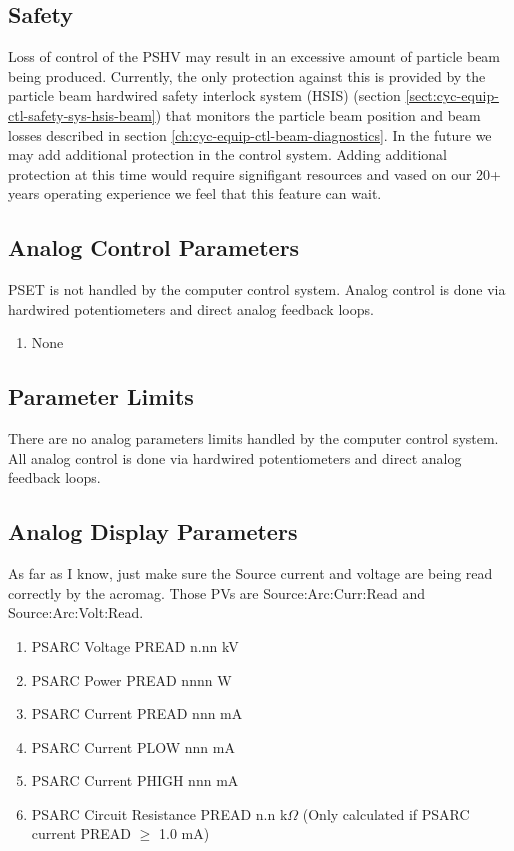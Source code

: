 \documentclass[11pt]{book}		%
\begin{document}
\subsection{Safety}

Loss of control of the PSHV may result in an excessive amount of particle beam being produced.  Currently, the only protection against this is provided by the particle beam hardwired safety interlock system (HSIS) (section \ref{sect:cyc-equip-ctl-safety-sys-hsis-beam}) that monitors the particle beam position and beam losses described in section \ref{ch:cyc-equip-ctl-beam-diagnostics}.  In the future we may add additional protection in the control system.  Adding additional protection at this time would require signifigant resources and vased on our 20+ years operating experience we feel that this feature can wait.

\subsection{Analog Control Parameters}

PSET is not handled by the computer control system.  Analog control is done via hardwired potentiometers and direct analog feedback loops.

\begin{enumerate}
 \item None
\end{enumerate}

\subsection{Parameter Limits}
There are no analog parameters limits handled by the computer control system.  All analog control is done via hardwired potentiometers and direct analog feedback loops.


\subsection{Analog Display Parameters}

\color{red}
As far as I know, just make sure the Source current and voltage are being read correctly by the acromag. Those PVs are Source:Arc:Curr:Read and Source:Arc:Volt:Read.
\color{black}

\begin{enumerate}
 \item PSARC Voltage PREAD n.nn kV
 \item PSARC Power PREAD nnnn W
 \item PSARC Current PREAD nnn mA
 \item PSARC Current PLOW  nnn mA
 \item PSARC Current PHIGH nnn mA
 \item PSARC Circuit Resistance PREAD  n.n k$\Omega$ (Only calculated if PSARC current PREAD $\geq$ 1.0 mA)
\end{enumerate}
\end{document}
